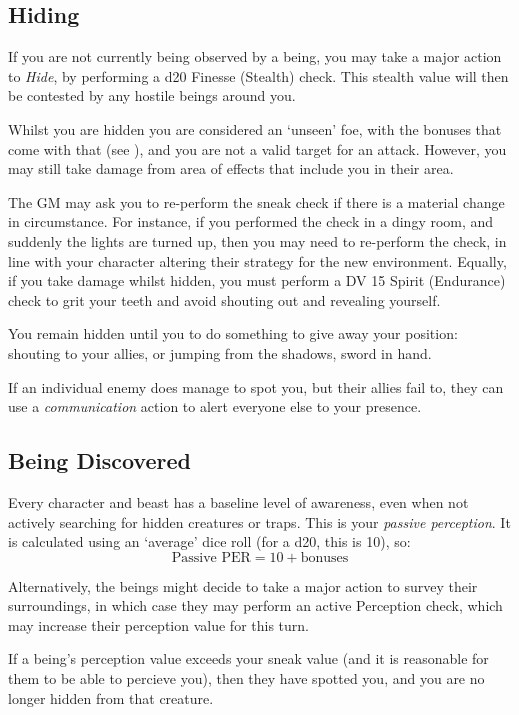 \subsection{Hiding}

If you are not currently being observed by a being, you may take a major action to {\it Hide}, by performing a d20 Finesse (Stealth) check. This stealth value will then be contested by any hostile beings around you. 

Whilst you are hidden you are considered an `unseen' foe, with the bonuses that come with that (see \pageref{S:Unseen}), and you are not a valid target for an attack. However, you may still take damage from area of effects that include you in their area. 

The GM may ask you to re-perform the sneak check if there is a material change in circumstance. For instance, if you performed the check in a dingy room, and suddenly the lights are turned up, then you may need to re-perform the check, in line with your character altering their strategy for the new environment. Equally, if you take damage whilst hidden, you must perform a DV 15 Spirit (Endurance) check to grit your teeth and avoid shouting out and revealing yourself. 

You remain hidden until you to do something to give away your position: shouting to your allies, or jumping from the shadows, sword in hand. 

If an individual enemy does manage to spot you, but their allies fail to, they can use a {\it communication} action to alert everyone else to your presence. 


\subsection{Being Discovered}

Every character and beast has a baseline level of awareness, even when not actively searching for hidden creatures or traps. This is your {\it passive perception}. It is calculated using an `average' dice roll (for a d20, this is 10), so: 
$$\text{Passive PER} = 10 + \text{bonuses}$$

Alternatively, the beings might decide to take a major action to survey their surroundings, in which case they may perform an active Perception check, which may increase their perception value for this turn. 

If a being's perception value exceeds your sneak value (and it is reasonable for them to be able to percieve you), then they have spotted you, and you are no longer hidden from that creature.  



